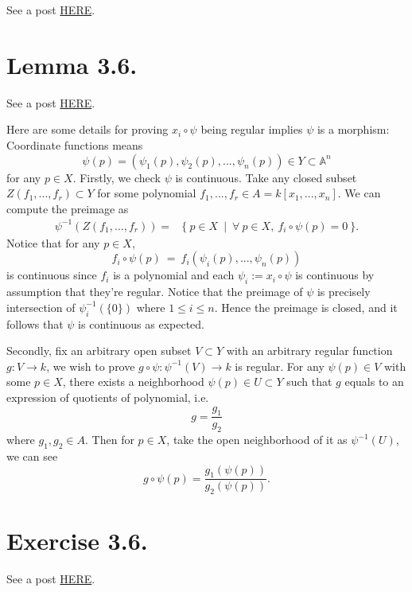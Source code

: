See a post \href{https://math.stackexchange.com/questions/787770/hartshorne-propositon-i-3-3}{HERE}.

\section{Lemma 3.6.}

See a post \href{https://math.stackexchange.com/questions/457328/hartshorne-lemma-i-3-6}{HERE}.

Here are some details for proving $x_i\circ \psi$ being regular implies $\psi$ is a morphism:
Coordinate functions means 
\[\psi(p)=(\psi_1(p),\psi_2(p),...,\psi_n(p))\in Y\subset \mathbb A^n\] for any $p\in X$.
Firstly, we check $\psi$ is continuous. Take any closed subset $Z(f_1,...,f_r)\subset Y$ for some polynomial $f_1,...,f_r\in A=k[x_1,...,x_n]$. We can compute the preimage as \begin{align*}
    \psi^{-1}(Z(f_1,...,f_r)) =& \{~ p\in X ~\mid ~\forall~ p\in X,~ f_i\circ \psi(p)=0 ~\}.
\end{align*}
Notice that for any $p\in X$, \[f_i\circ \psi(p) ~=~ f_i(\psi_i(p),...,\psi_n(p))\] is continuous since $f_i$ is a polynomial and each $\psi_i:=x_i\circ \psi$ is continuous by assumption that they're regular.
Notice that the preimage of $\psi$ is precisely intersection of $\psi_i^{-1}(\{0\})$ where $1\leq i\leq n$. Hence the preimage is closed, and it follows that $\psi$ is continuous as expected. 

Secondly, fix an arbitrary open subset $V\subset Y$ with an arbitrary regular function $g:V\to k$, we wish to prove $g\circ \psi:\psi^{-1}(V)\to k$ is regular. For any $\psi(p)\in V$ with some $p\in X$, there exists a neighborhood $\psi(p)\in U\subset Y$ such that $g$ equals to an expression of quotients of polynomial, i.e. \[g=\frac{g_1}{g_2}\] where $g_1,g_2\in A$. Then for $p\in X$, take the open neighborhood of it as $\psi^{-1}(U)$, we can see 
\[g\circ \psi (p) = \frac{g_1(\psi(p))}{g_2(\psi(p))}.\]

\section{Exercise 3.6.}

See a post \href{https://math.stackexchange.com/questions/2120717/there-are-quasi-affine-varieties-which-are-not-affine#:~:text=I%20see%20this%20sentence%20in,(0%2C0)%7D.}{HERE}. 